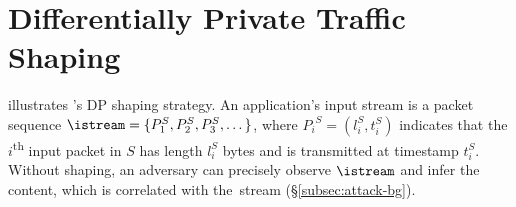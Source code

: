 \section{Differentially Private Traffic Shaping}
\label{sec:dp}


 illustrates {\sys}'s DP shaping strategy.
An application's input stream is a packet sequence
$\istream = \{{P^S_1}, {P^S_2}, {P^S_3}, \dots \}$,
where ${P_i}^S = (l^S_i, t^S_i)$ indicates that the $i$\textsuperscript{th} input
packet in $S$ has length $l^S_i$ bytes and is transmitted at timestamp $t^S_i$.
Without shaping, an adversary can precisely observe $\istream$ and infer
the content,
which is correlated with the~stream (\S\ref{subsec:attack-bg}). %
\fi

